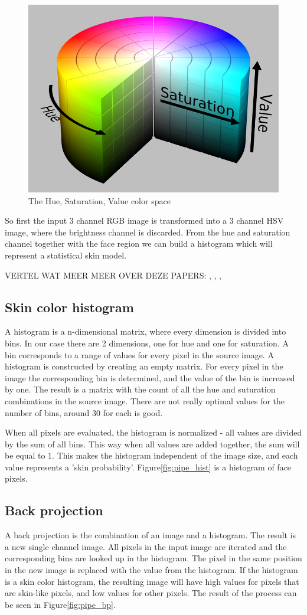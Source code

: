 \begin{figure}[htbp]
	\center
	\includegraphics[width=0.4\linewidth]{figures/hsv.png}
	\caption{The Hue, Saturation, Value color space}
	\label{fig:hsv}
\end{figure}

So first the input 3 channel RGB image is transformed into a 3 channel HSV image, where the brightness channel is discarded. From the hue and saturation channel together with the face region we can build a histogram which will represent a statistical skin model.


VERTEL WAT MEER MEER OVER DEZE PAPERS:
\cite{Stenger06template-basedhand}, \cite{Bradski98computervision}, \cite{Cooper07largelexicon},


\subsection*{Skin color histogram}
A histogram is a n-dimensional matrix, where every dimension is divided into bins. In our case there are 2 dimensions, one for hue and one for saturation. A bin corresponds to a range of values for every pixel in the source image. A histogram is constructed by creating an empty matrix. For every pixel in the image the corresponding bin is determined, and the value of the bin is increased by one. The result is a matrix with the count of all the hue and suturation combinations in the source image. There are not really optimal values for the number of bins, around 30 for each is good.

When all pixels are evaluated, the histogram is normalized - all values are divided by the sum of all bins. This way when all values are added together, the sum will be equal to 1. This makes the histogram independent of the image size, and each value represents a 'skin probability'. Figure\ref{fig:pipe_hist} is a histogram of face pixels.

\subsection*{Back projection}
A back projection is the combination of an image and a histogram. The result is a new single channel image. All pixels in the input image are iterated and the corresponding bins are looked up in the histogram. The pixel in the same position in the new image is replaced with the value from the histogram. If the histogram is a skin color histogram, the resulting image will have high values for pixels that are skin-like pixels, and low values for other pixels. The result of the process can be seen in Figure\ref{fig:pipe_bp}.



